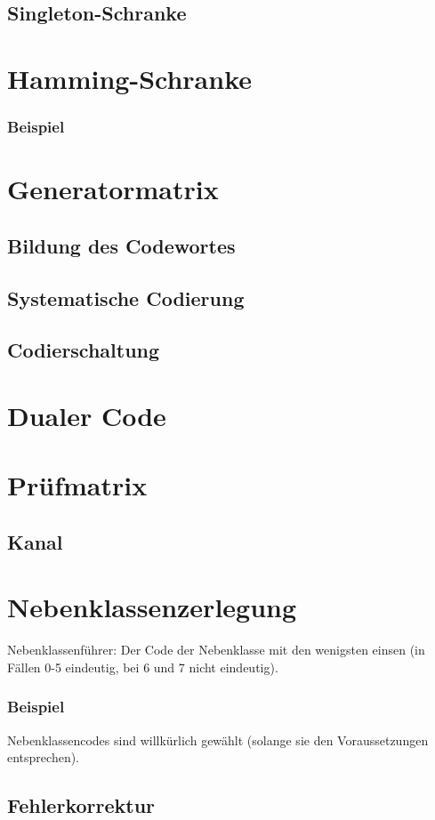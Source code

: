 \subsection{Singleton-Schranke}

\section{Hamming-Schranke}
\subsubsection*{Beispiel}

\section{Generatormatrix}
\subsection{Bildung des Codewortes}
\subsection{Systematische Codierung}
\subsection{Codierschaltung}

\section{Dualer Code}

\section{Prüfmatrix}
\subsection*{Kanal}

\section{Nebenklassenzerlegung}
Nebenklassenführer: Der Code der Nebenklasse mit den wenigsten einsen (in Fällen 0-5 eindeutig, bei 6 und 7 nicht eindeutig).
\subsubsection*{Beispiel}
Nebenklassencodes sind willkürlich gewählt (solange sie den Voraussetzungen entsprechen).
\subsection{Fehlerkorrektur}







